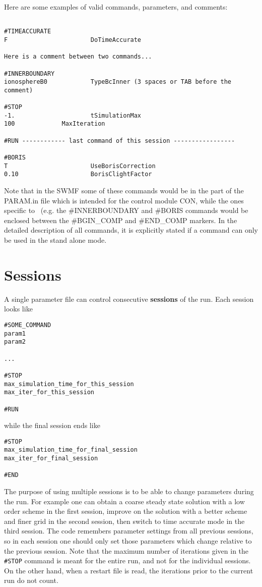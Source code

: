 Here are some examples of valid commands, parameters, and comments:
\begin{verbatim}

#TIMEACCURATE
F                       DoTimeAccurate

Here is a comment between two commands...

#INNERBOUNDARY
ionosphereB0            TypeBcInner (3 spaces or TAB before the comment)

#STOP
-1.                     tSimulationMax
100		        MaxIteration

#RUN ------------ last command of this session -----------------

#BORIS
T                       UseBorisCorrection
0.10                    BorisClightFactor

\end{verbatim}
Note that in the SWMF some of these commands would be in the
part of the PARAM.in file which is intended for the control 
module CON, while the ones specific to \BATSRUS\ (e.g. the
\#INNERBOUNDARY and \#BORIS commands would be enclosed
between the \#BGIN\_COMP and \#END\_COMP markers.
In the detailed description of all commands, 
it is explicitly stated if a command can only be used in 
the stand alone mode.

\section{Sessions \label{section:sessions}}

A single parameter file can control consecutive {\bf sessions}
of the run. Each session looks like
\begin{verbatim}
#SOME_COMMAND
param1
param2

...

#STOP
max_simulation_time_for_this_session
max_iter_for_this_session

#RUN
\end{verbatim}
while the final session ends like
\begin{verbatim}
#STOP
max_simulation_time_for_final_session
max_iter_for_final_session

#END
\end{verbatim}
The purpose of using multiple sessions is to be able to change parameters 
during the run. For example one can obtain a coarse steady state solution
with a low order scheme in the first session, improve on the solution
with a better scheme and finer grid in the second session, then switch
to time accurate mode in the third session. The code remembers parameter
settings from all previous sessions, so in each session one should only
set those parameters which change relative to the previous session.
Note that the maximum number of iterations given in the {\tt \#STOP} command 
is meant for the entire run, and not for the individual sessions. 
On the other hand, when a restart file is read, the iterations prior to 
the current run do not count.


